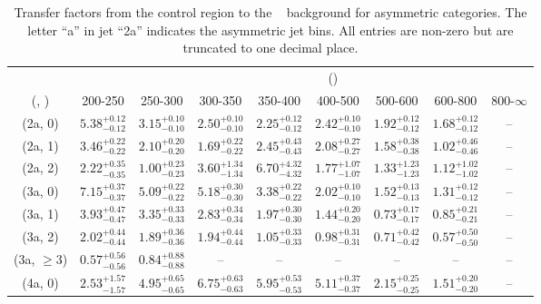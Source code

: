 \begin{table}[h!]
\tiny
\centering
\caption{Transfer factors from the \mmj control region to the \zInv~ background for asymmetric categories. The letter ``a'' in jet \eg ``2a''  indicates the asymmetric jet bins. All entries are non-zero but are truncated to one decimal place.\label{tab:tf_mumu_zinv_asym}}
\begin{tabular}
{ccccccccc}
	\hline\hline
&	& \multicolumn{8}{c}{\scalht (\gev)} \\ 
	 (\njet,  \nb) & 200-250 & 250-300 & 300-350 & 350-400 & 400-500 & 500-600 & 600-800 & 800-$\infty$ \\ [0.8ex] 
\hline
	(2a, 0) & $5.38^{+ 0.12 }_{- 0.12 }$ & $3.15^{+ 0.10 }_{- 0.10 }$ & $2.50^{+ 0.10 }_{- 0.10 }$ & $2.25^{+ 0.12 }_{- 0.12 }$ & $2.42^{+ 0.10 }_{- 0.10 }$ & $1.92^{+ 0.12 }_{- 0.12 }$ & $1.68^{+ 0.12 }_{- 0.12 }$ & -- \\[0.5ex] 
	(2a, 1) & $3.46^{+ 0.22 }_{- 0.22 }$ & $2.10^{+ 0.20 }_{- 0.20 }$ & $1.69^{+ 0.22 }_{- 0.22 }$ & $2.45^{+ 0.43 }_{- 0.43 }$ & $2.08^{+ 0.27 }_{- 0.27 }$ & $1.58^{+ 0.38 }_{- 0.38 }$ & $1.02^{+ 0.46 }_{- 0.46 }$ & -- \\[0.5ex] 
	(2a, 2) & $2.22^{+ 0.35 }_{- 0.35 }$ & $1.00^{+ 0.23 }_{- 0.23 }$ & $3.60^{+ 1.34 }_{- 1.34 }$ & $6.70^{+ 4.32 }_{- 4.32 }$ & $1.77^{+ 1.07 }_{- 1.07 }$ & $1.33^{+ 1.23 }_{- 1.23 }$ & $1.12^{+ 1.02 }_{- 1.02 }$ & -- \\[0.5ex] 
	(3a, 0) & $7.15^{+ 0.37 }_{- 0.37 }$ & $5.09^{+ 0.22 }_{- 0.22 }$ & $5.18^{+ 0.30 }_{- 0.30 }$ & $3.38^{+ 0.22 }_{- 0.22 }$ & $2.02^{+ 0.10 }_{- 0.10 }$ & $1.52^{+ 0.13 }_{- 0.13 }$ & $1.31^{+ 0.12 }_{- 0.12 }$ & -- \\[0.5ex] 
	(3a, 1) & $3.93^{+ 0.47 }_{- 0.47 }$ & $3.35^{+ 0.33 }_{- 0.33 }$ & $2.83^{+ 0.34 }_{- 0.34 }$ & $1.97^{+ 0.30 }_{- 0.30 }$ & $1.44^{+ 0.20 }_{- 0.20 }$ & $0.73^{+ 0.17 }_{- 0.17 }$ & $0.85^{+ 0.21 }_{- 0.21 }$ & -- \\[0.5ex] 
	(3a, 2) & $2.02^{+ 0.44 }_{- 0.44 }$ & $1.89^{+ 0.36 }_{- 0.36 }$ & $1.94^{+ 0.44 }_{- 0.44 }$ & $1.05^{+ 0.33 }_{- 0.33 }$ & $0.98^{+ 0.31 }_{- 0.31 }$ & $0.71^{+ 0.42 }_{- 0.42 }$ & $0.57^{+ 0.50 }_{- 0.50 }$ & -- \\[0.5ex] 
	(3a, $\ge3$) & $0.57^{+ 0.56 }_{- 0.56 }$ & $0.84^{+ 0.88 }_{- 0.88 }$ & -- & -- & -- & -- & -- & -- \\[0.5ex] 
	(4a, 0) & $2.53^{+ 1.57 }_{- 1.57 }$ & $4.95^{+ 0.65 }_{- 0.65 }$ & $6.75^{+ 0.63 }_{- 0.63 }$ & $5.95^{+ 0.53 }_{- 0.53 }$ & $5.11^{+ 0.37 }_{- 0.37 }$ & $2.15^{+ 0.25 }_{- 0.25 }$ & $1.51^{+ 0.20 }_{- 0.20 }$ & -- \\[0.5ex] 

\end{tabular}
\end{table}
